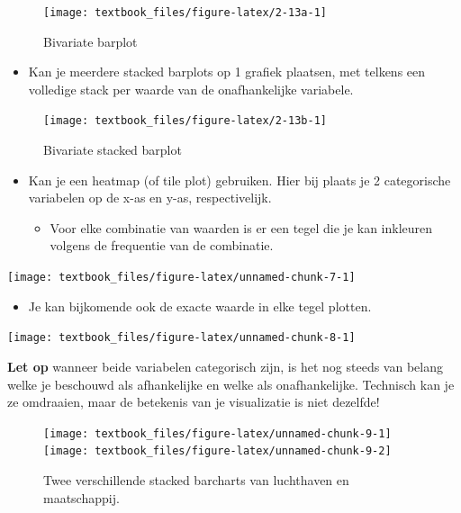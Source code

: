 \documentclass[]{tufte-book}
\providecommand{\tightlist}{%
  \setlength{\itemsep}{0pt}\setlength{\parskip}{0pt}}
\begin{document}
\begin{figure}
\texttt{[image: textbook\_files/figure-latex/2-13a-1]} \caption[Bivariate barplot]{Bivariate barplot}\label{fig:2-13a}
\end{figure}

\begin{itemize}
\tightlist
\item
  Kan je meerdere stacked barplots op 1 grafiek plaatsen, met telkens een volledige stack per waarde van de onafhankelijke variabele.
\end{itemize}

\begin{figure}
\texttt{[image: textbook\_files/figure-latex/2-13b-1]} \caption[Bivariate stacked barplot]{Bivariate stacked barplot}\label{fig:2-13b}
\end{figure}

\begin{itemize}
\tightlist
\item
  Kan je een heatmap (of tile plot) gebruiken. Hier bij plaats je 2 categorische variabelen op de x-as en y-as, respectivelijk.

  \begin{itemize}
  \tightlist
  \item
    Voor elke combinatie van waarden is er een tegel die je kan inkleuren volgens de frequentie van de combinatie.
  \end{itemize}
\end{itemize}

\texttt{[image: textbook\_files/figure-latex/unnamed-chunk-7-1]}

\begin{itemize}
\tightlist
\item
  Je kan bijkomende ook de exacte waarde in elke tegel plotten.
\end{itemize}

\texttt{[image: textbook\_files/figure-latex/unnamed-chunk-8-1]}

\textbf{Let op} wanneer beide variabelen categorisch zijn, is het nog steeds van belang welke je beschouwd als afhankelijke en welke als onafhankelijke. Technisch kan je ze omdraaien, maar de betekenis van je visualizatie is niet dezelfde!

\begin{figure}
\texttt{[image: textbook\_files/figure-latex/unnamed-chunk-9-1]} \texttt{[image: textbook\_files/figure-latex/unnamed-chunk-9-2]} \caption[Twee verschillende stacked barcharts van luchthaven en maatschappij]{Twee verschillende stacked barcharts van luchthaven en maatschappij.}\label{fig:unnamed-chunk-9}
\end{figure}
\end{document}
